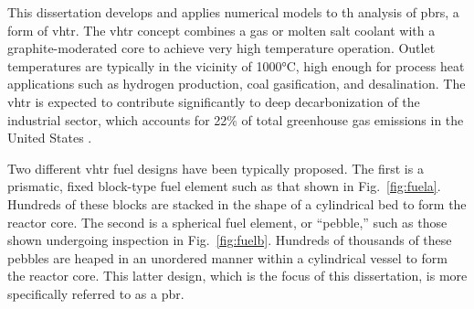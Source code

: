 This dissertation develops and applies numerical models to \gls{th} analysis of \glspl{pbr}, a form of \gls{vhtr}. The \gls{vhtr} concept combines a gas or molten salt coolant with a graphite-moderated core to achieve very high temperature operation. Outlet temperatures are typically in the vicinity of 1000\si{\celsius}, high enough for process heat applications such as hydrogen production, coal gasification, and desalination. The \gls{vhtr} is expected to contribute significantly to deep decarbonization of the industrial sector, which accounts for 22\% of total greenhouse gas emissions in the United States \cite{epa}. 

Two different \gls{vhtr} fuel designs have been typically proposed. The first is a prismatic, fixed block-type fuel element such as that shown in Fig.\ \ref{fig:fuela}. Hundreds of these blocks are stacked in the shape of a cylindrical bed to form the reactor core. The second is a spherical fuel element, or ``pebble,'' such as those shown undergoing inspection in Fig.\ \ref{fig:fuelb}. Hundreds of thousands of these pebbles are heaped in an unordered manner within a cylindrical vessel to form the reactor core. This latter design, which is the focus of this dissertation, is more specifically referred to as a \gls{pbr}.

